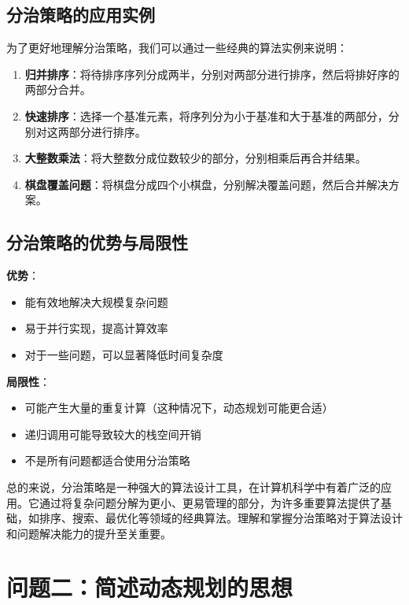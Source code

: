 \documentclass[12pt]{article}
\begin{document}
\subsection{分治策略的应用实例}

为了更好地理解分治策略，我们可以通过一些经典的算法实例来说明：

\begin{enumerate}
\item \textbf{归并排序}：将待排序序列分成两半，分别对两部分进行排序，然后将排好序的两部分合并。


\item \textbf{快速排序}：选择一个基准元素，将序列分为小于基准和大于基准的两部分，分别对这两部分进行排序。

\item \textbf{大整数乘法}：将大整数分成位数较少的部分，分别相乘后再合并结果。

\item \textbf{棋盘覆盖问题}：将棋盘分成四个小棋盘，分别解决覆盖问题，然后合并解决方案。
\end{enumerate}

\subsection{分治策略的优势与局限性}

\textbf{优势}：
\begin{itemize}
\item 能有效地解决大规模复杂问题
\item 易于并行实现，提高计算效率
\item 对于一些问题，可以显著降低时间复杂度
\end{itemize}

\textbf{局限性}：
\begin{itemize}
\item 可能产生大量的重复计算（这种情况下，动态规划可能更合适）
\item 递归调用可能导致较大的栈空间开销
\item 不是所有问题都适合使用分治策略
\end{itemize}

总的来说，分治策略是一种强大的算法设计工具，在计算机科学中有着广泛的应用。它通过将复杂问题分解为更小、更易管理的部分，为许多重要算法提供了基础，如排序、搜索、最优化等领域的经典算法。理解和掌握分治策略对于算法设计和问题解决能力的提升至关重要。


\section{问题二：简述动态规划的思想}
\end{document}
